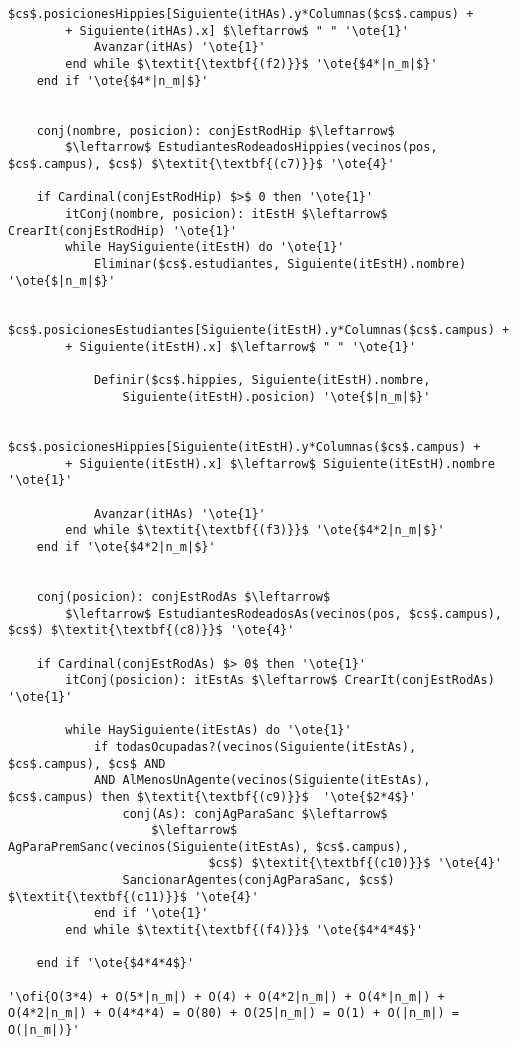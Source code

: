 \begin{lstlisting}[mathescape]
			$cs$.posicionesHippies[Siguiente(itHAs).y*Columnas($cs$.campus) +
		+ Siguiente(itHAs).x] $\leftarrow$ " " '\ote{1}'
			Avanzar(itHAs) '\ote{1}'
		end while $\textit{\textbf{(f2)}}$ '\ote{$4*|n_m|$}'
	end if '\ote{$4*|n_m|$}'


	conj(nombre, posicion): conjEstRodHip $\leftarrow$
		$\leftarrow$ EstudiantesRodeadosHippies(vecinos(pos, $cs$.campus), $cs$) $\textit{\textbf{(c7)}}$ '\ote{4}'

	if Cardinal(conjEstRodHip) $>$ 0 then '\ote{1}'
		itConj(nombre, posicion): itEstH $\leftarrow$ CrearIt(conjEstRodHip) '\ote{1}'
		while HaySiguiente(itEstH) do '\ote{1}'
			Eliminar($cs$.estudiantes, Siguiente(itEstH).nombre) '\ote{$|n_m|$}'

			$cs$.posicionesEstudiantes[Siguiente(itEstH).y*Columnas($cs$.campus) +
		+ Siguiente(itEstH).x] $\leftarrow$ " " '\ote{1}'

			Definir($cs$.hippies, Siguiente(itEstH).nombre,
				Siguiente(itEstH).posicion) '\ote{$|n_m|$}'

			$cs$.posicionesHippies[Siguiente(itEstH).y*Columnas($cs$.campus) +
		+ Siguiente(itEstH).x] $\leftarrow$ Siguiente(itEstH).nombre '\ote{1}'

			Avanzar(itHAs) '\ote{1}'
		end while $\textit{\textbf{(f3)}}$ '\ote{$4*2|n_m|$}'
	end if '\ote{$4*2|n_m|$}'


	conj(posicion): conjEstRodAs $\leftarrow$
		$\leftarrow$ EstudiantesRodeadosAs(vecinos(pos, $cs$.campus), $cs$) $\textit{\textbf{(c8)}}$ '\ote{4}'

	if Cardinal(conjEstRodAs) $> 0$ then '\ote{1}'
		itConj(posicion): itEstAs $\leftarrow$ CrearIt(conjEstRodAs) '\ote{1}'

		while HaySiguiente(itEstAs) do '\ote{1}'
			if todasOcupadas?(vecinos(Siguiente(itEstAs), $cs$.campus), $cs$ AND
			AND AlMenosUnAgente(vecinos(Siguiente(itEstAs), $cs$.campus) then $\textit{\textbf{(c9)}}$  '\ote{$2*4$}'
				conj(As): conjAgParaSanc $\leftarrow$
					$\leftarrow$ AgParaPremSanc(vecinos(Siguiente(itEstAs), $cs$.campus),
							$cs$) $\textit{\textbf{(c10)}}$ '\ote{4}'
				SancionarAgentes(conjAgParaSanc, $cs$) $\textit{\textbf{(c11)}}$ '\ote{4}'
			end if '\ote{1}'
		end while $\textit{\textbf{(f4)}}$ '\ote{$4*4*4$}'

	end if '\ote{$4*4*4$}'

'\ofi{O(3*4) + O(5*|n_m|) + O(4) + O(4*2|n_m|) + O(4*|n_m|) + O(4*2|n_m|) + O(4*4*4) = O(80) + O(25|n_m|) = O(1) + O(|n_m|) = O(|n_m|)}'
\end{lstlisting}

